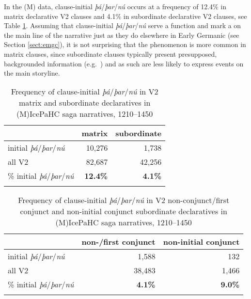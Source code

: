 \documentclass[output=paper,colorlinks,citecolor=brown]{langscibook}
\begin{document}
\noindent In the (M) data, clause-initial \textit{þá}/\textit{þar}/\textit{nú} occurs at a frequency of 12.4\% in matrix declarative V2 clauses and 4.1\% in subordinate declarative V2 clauses, see Table \ref{tab:initial_da}. Assuming that clause-initial \textit{þá}/\textit{þar}/\textit{nú} serve a  function and mark a  on the main line of the narrative just as they do elsewhere in Early Germanic (see Section \ref{sect:emgc}), it is not surprising that the phenomenon is more common in matrix clauses, since subordinate clauses typically present presupposed, backgrounded information (e.g.~\citealp{HooperHooper1973, quirk1985comprehensive,matsuda1998conservatism,matic2014information}) and as such are less likely to express events on the main storyline. 

\begin{table}
\caption{Frequency of clause-initial \textit{þá}/\textit{þar}/\textit{nú} in V2 matrix and subordinate declaratives in (M)IcePaHC saga narratives, 1210--1450}
\label{tab:initial_da}
 \begin{tabularx}{.6\textwidth}{X rr}
  \lsptoprule
  & matrix & subordinate\\
  \midrule
initial \textit{þá}/\textit{þar}/\textit{nú} & 10,276  &  1,738  \\
all V2                                       &  82,687 &  42,256  \\
\% initial \textit{þá}/\textit{þar}/\textit{nú} & \textbf{12.4\%} & \textbf{4.1\%} \\
  \lspbottomrule
 \end{tabularx}
\end{table}

\begin{table}[b]
\caption{Frequency of clause-initial \textit{þá}/\textit{þar}/\textit{nú} in V2 non-conjunct/first conjunct and non-initial conjunct subordinate declaratives in (M)IcePaHC saga narratives, 1210--1450}
\label{tab:initial_da_sub_conj}
 \begin{tabularx}{.85\textwidth}{X rr}
  \lsptoprule
  & non-/first conjunct & non-initial conjunct\\
  \midrule
initial \textit{þá}/\textit{þar}/\textit{nú} & 1,588 &  132  \\
all V2                                       & 38,483  &  1,466  \\
\% initial \textit{þá}/\textit{þar}/\textit{nú} & \textbf{4.1\%} & \textbf{9.0\%} \\
  \lspbottomrule
 \end{tabularx}
\end{table}
\end{document}
